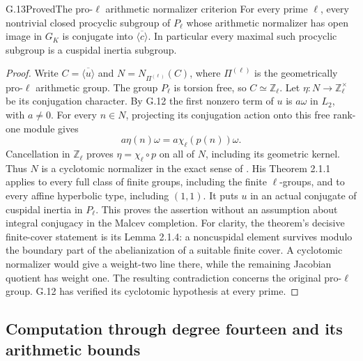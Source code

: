 \begin{statement}{G.13}{Proved}{The pro-$\ell$ arithmetic normalizer criterion}
For every prime $\ell$, every nontrivial closed procyclic subgroup
of $P_\ell$ whose arithmetic
normalizer has open image in $G_K$ is conjugate into
$\overline{\langle c\rangle}$. In particular every maximal such
procyclic subgroup is a cuspidal inertia subgroup.
\end{statement}
\begin{proof}
Write $C=\overline{\langle u\rangle}$ and $N=N_{\Pi^{(\ell)}}(C)$,
where $\Pi^{(\ell)}$ is the geometrically pro-$\ell$ arithmetic group.
The group $P_\ell$ is torsion free, so $C\simeq\mathbb Z_\ell$.
Let $\eta:N\to\mathbb Z_\ell^\times$ be its conjugation character.
By G.12 the first nonzero term of $u$ is $a\omega$ in $L_2$,
with $a\ne0$. For every $n\in N$, projecting its conjugation
action onto this free rank-one module gives
\[
             a\eta(n)\omega=a\chi_\ell(p(n))\omega.
\]
Cancellation in $\mathbb Z_\ell$ proves $\eta=\chi_\ell\circ p$
on all of $N$, including its geometric kernel. Thus $N$ is a
cyclotomic normalizer in the exact sense of
\citet[\S2.1, Definition preceding Theorem 2.1.1]{Nakamura1994}.
His Theorem 2.1.1 applies to every full class of finite groups,
including the finite $\ell$-groups, and to every affine hyperbolic
type, including $(1,1)$. It puts $u$ in an actual conjugate of
cuspidal inertia in $P_\ell$. This proves the assertion without an
assumption about integral conjugacy in the Malcev completion.
For clarity, the theorem's decisive finite-cover statement is its
Lemma 2.1.4: a noncuspidal element survives modulo the boundary
part of the abelianization of a suitable finite cover. A
cyclotomic normalizer would give a weight-two line there, while
the remaining Jacobian quotient has weight one. The resulting
contradiction concerns the original pro-$\ell$ group. G.12 has
verified its cyclotomic hypothesis at every prime.
\end{proof}

\subsection{Computation through degree fourteen and its arithmetic bounds}

